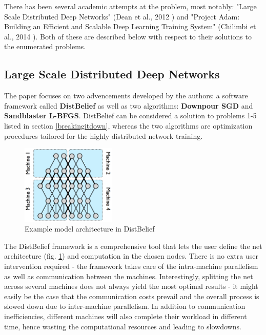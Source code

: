 \documentclass[a4paper, 11pt]{article}
\numberwithin{equation}{section}
\begin{document}
		There has been several academic attempts at the problem, most notably: "Large Scale Distributed Deep Networks" (Dean et al., 2012 \cite{dean2012large}) and "Project Adam: Building an Efficient and Scalable Deep Learning Training System" (Chilimbi et al., 2014 \cite{chilimbi2014project}). Both of these are described below with respect to their solutions to the enumerated problems.
		
		\subsection{Large Scale Distributed Deep Networks}
		
		The paper focuses on two advencements developed by the authors: a software framework called \textbf{DistBelief} as well as two algorithms: \textbf{Downpour SGD} and \textbf{Sandblaster L-BFGS}. DistBelief can be considered a solution to problems 1-5 listed in section \ref{breakingitdown}, whereas the two algorithms are optimization procedures tailored for the highly distributed network training.
		
		\begin{figure}[H]
		\centering
		\includegraphics[width=0.40\textwidth]{distbelief.png}
		\caption{\label{fig:distbelief}Example model architecture in DistBelief \cite{dean2012large}}
		\end{figure}
		
		The DistBelief framework is a comprehensive tool that lets the user define the net architecture (fig. \ref{fig:distbelief}) and computation in the chosen nodes. There is no extra user intervention required - the framework takes care of the intra-machine parallelism as well as communication between the machines. Interestingly, splitting the net across several machines does not always yield the most optimal results - it might easily be the case that the communication costs prevail and the overall process is slowed down due to inter-machine parallelism. In addition to communication inefficiencies, different machines will also complete their workload in different time, hence wasting the computational resources and leading to slowdowns.
		
\end{document}
